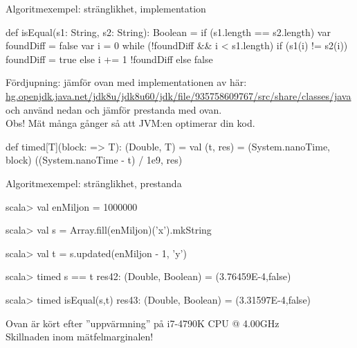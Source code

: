 \begin{Slide}{Algoritmexempel: stränglikhet, implementation}\SlideFontSmall
\begin{Code}
def isEqual(s1: String, s2: String): Boolean = {
  if (s1.length == s2.length) {
    var foundDiff = false
    var i = 0
    while (!foundDiff && i < s1.length) {
      if (s1(i) != s2(i)) foundDiff = true
      else i += 1
    }
    !foundDiff
  } else false
}
\end{Code}
\pause
{\SlideFontTiny Fördjupning: jämför ovan med implementationen av  här:
\href{http://hg.openjdk.java.net/jdk8u/jdk8u60/jdk/file/935758609767/src/share/classes/java/lang/String.java#l976}{hg.openjdk.java.net/jdk8u/jdk8u60/jdk/file/935758609767/src/share/classes/java} \\ och använd  nedan och jämför prestanda med  ovan.\\
Obs! Mät många gånger så att JVM:en optimerar din kod.}
\vspace{-0.25em}\begin{Code}
def timed[T](block: => T): (Double, T) = {
  val (t, res) = (System.nanoTime, block)
  ((System.nanoTime - t) / 1e9, res)
}
\end{Code}

\end{Slide}

\begin{Slide}{Algoritmexempel: stränglikhet, prestanda}
\begin{REPL}
scala> val enMiljon = 1000000

scala> val s = Array.fill(enMiljon)('x').mkString

scala> val t = s.updated(enMiljon - 1, 'y')

scala> timed { s == t }
res42: (Double, Boolean) = (3.76459E-4,false)

scala> timed { isEqual(s,t) }
res43: (Double, Boolean) = (3.31597E-4,false)
\end{REPL}
Ovan är kört efter ''uppvärmning'' på i7-4790K CPU @ 4.00GHz \\
Skillnaden inom mätfelmarginalen!
\end{Slide}



